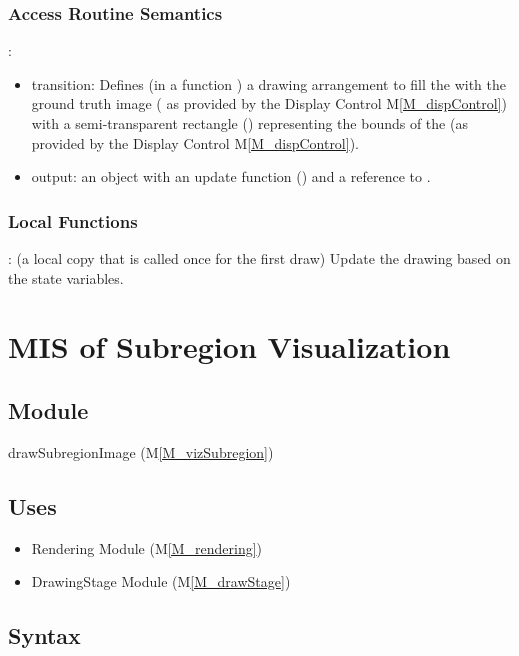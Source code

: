 \documentclass[12pt, titlepage]{article}
\newcommand{\mref}[1]{M\ref{#1}}
\newcommand{\mrefp}[1]{(\mref{#1})}
\newcommand{\mreff}[1]{Module \mrefp{#1}}
\begin{document}
\subsubsection{Access Routine Semantics}

\noindent {}:
\begin{itemize}
\item transition: Defines (in a function ) a drawing arrangement to fill the 
  with the ground truth image
  ( as provided by the Display Control \mref{M_dispControl})
  with a semi-transparent rectangle () representing the bounds of the
   (as provided by the Display Control \mref{M_dispControl}).
\item output: an object with an update function () and a reference to .
\end{itemize}

\subsubsection{Local Functions}
: (a local copy that is called once for the first draw)
  Update the drawing based on the state variables.

\newpage



\section{MIS of Subregion Visualization} \label{MS_vizSubregion}

\subsection{Module}
drawSubregionImage \mrefp{M_vizSubregion}

\subsection{Uses}
\begin{itemize}
  \item Rendering \mreff{M_rendering}
  \item DrawingStage \mreff{M_drawStage}
\end{itemize}

\subsection{Syntax}
\end{document}
